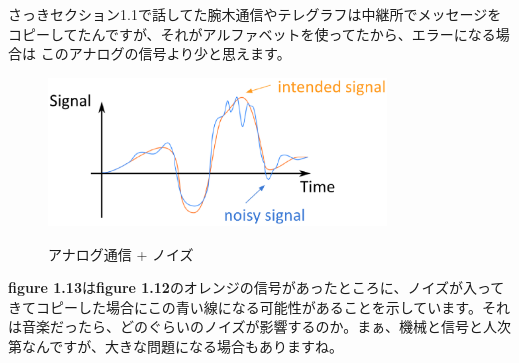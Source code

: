 さっきセクション1.1で話してた腕木通信やテレグラフは中継所でメッセージをコピーしてたんですが、それがアルファベットを使ってたから、エラーになる場合は
このアナログの信号より少と思えます。
\begin{figure}[H]
    \includegraphics[width=0.8\textwidth]{lesson1/continuous_signal_noise.eps}
    \label{fig: 1}
    \caption{アナログ通信 + ノイズ}
\end{figure}

\textbf{figure 1.13}は\textbf{figure 1.12}のオレンジの信号があったところに、ノイズが入ってきてコピーした場合にこの青い線になる可能性があることを示しています。それは音楽だったら、どのぐらいのノイズが影響するのか。まぁ、機械と信号と人次第なんですが、大きな問題になる場合もありますね。

